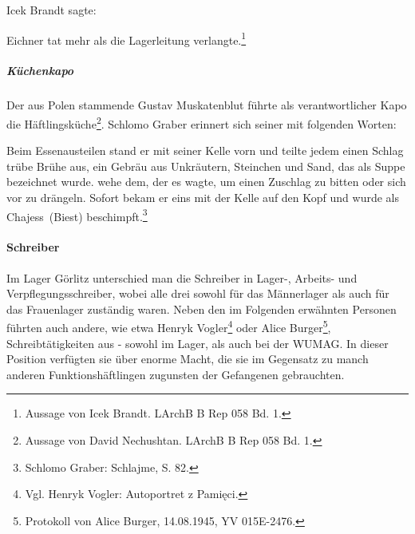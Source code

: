 Icek Brandt sagte:
\begin{leftbar}
Eichner tat mehr als die Lagerleitung verlangte.\footnote{Aussage von Icek Brandt. LArchB B Rep 058 Bd. 1.}
\end{leftbar}


 \subparagraph{Küchenkapo}
Der aus Polen stammende Gustav Muskatenblut führte als verantwortlicher Kapo die Häftlingsküche\footnote{Aussage von David Nechushtan. LArchB B Rep 058 Bd. 1.}. Schlomo Graber erinnert sich seiner mit folgenden Worten:
\begin{leftbar}
Beim Essenausteilen stand er mit seiner Kelle vorn und teilte jedem einen Schlag trübe Brühe aus, ein Gebräu aus Unkräutern, Steinchen und Sand, das als Suppe bezeichnet wurde. wehe dem, der es wagte, um einen Zuschlag zu bitten oder sich vor zu drängeln. Sofort bekam er eins mit der Kelle auf den Kopf und wurde als \glqq Chajess\grqq~(\glqq Biest\grqq) beschimpft.\footnote{Schlomo Graber: Schlajme, S. 82.}
\end{leftbar}

\paragraph{Schreiber}
\label{schreiber}
Im Lager Görlitz unterschied man die Schreiber in Lager-, Arbeits- und Ver\-pfleg\-ungs\-schreiber, wobei alle drei sowohl für das Männerlager als auch für das Frauenlager zuständig waren. Neben den im Folgenden erwähnten Personen führten auch andere, wie etwa Henryk Vogler\footnote{Vgl. Henryk Vogler: Autoportret z Pamięci.} oder Alice Burger\footnote{Protokoll von Alice Burger, 14.08.1945, YV 015E-2476.}, Schreibtätigkeiten aus - sowohl im Lager, als auch bei der WUMAG.
In dieser Position verfügten sie über enorme Macht, die sie im Gegensatz zu manch anderen Funktionshäftlingen zugunsten der Gefangenen gebrauchten.

